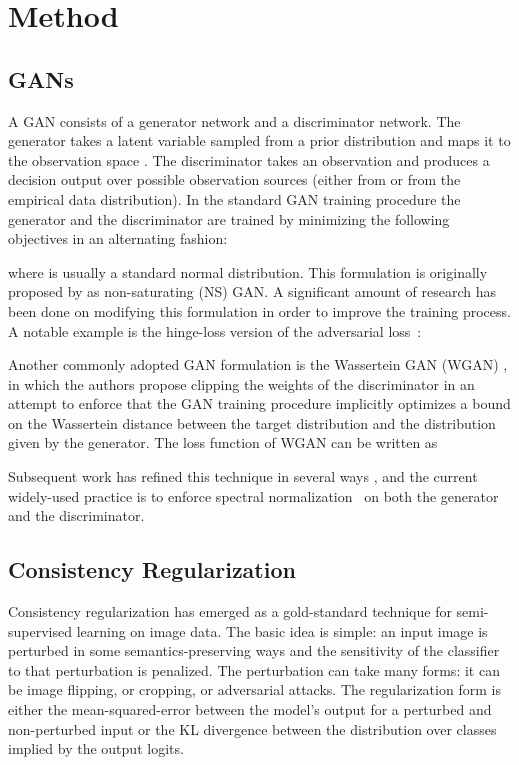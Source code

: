 \documentclass{article} \usepackage{iclr2020_conference,times}
\begin{document}
\section{Method}

\subsection{GANs} \label{sec:gans}
A GAN consists of a generator network and a discriminator network.
The generator  takes a latent variable  sampled from a prior distribution and maps it to the observation space .
The discriminator  takes an observation  and produces a decision output over possible observation sources (either from  or from the empirical data distribution). 
In the standard GAN training procedure the generator  and the discriminator  are trained by minimizing the following objectives in an alternating fashion:

where  is usually a standard normal distribution. This formulation is originally proposed by \citet{goodfellow2014generative} as non-saturating (NS) GAN. A significant amount of research has been done on modifying this formulation in order to improve the training process. A notable example is the hinge-loss version of the adversarial loss~\citep{lim2017, Tran2017}:

Another commonly adopted GAN formulation is the Wassertein GAN (WGAN) \citep{WGAN}, in which the authors propose clipping the weights of the discriminator in an attempt to enforce that the GAN training procedure implicitly optimizes
a bound on the Wassertein distance between the target distribution and the distribution given by the generator. The loss function of WGAN can be written as

Subsequent work has refined this technique in several ways 
\citep{WGANGP,Miyato18a,SAGAN},
and the current widely-used practice is to enforce spectral normalization~\citep{Miyato18a} on both the generator and the discriminator.

\subsection{Consistency Regularization}
Consistency regularization has emerged as a gold-standard technique \citep{CONSISTENCY,laine2016temporal,CONSISTENCYAVITAL,UDACONSISTENCY,REALISTICSSL, mixmatch2019} for
semi-supervised learning on image data.
The basic idea is simple: an input image is perturbed in some semantics-preserving ways
and the sensitivity of the classifier to that perturbation is penalized. 
The perturbation can take many forms: it can be image flipping, or cropping, or adversarial attacks.
The regularization form is either the mean-squared-error \citep{CONSISTENCY,laine2016temporal} between the model's output for a perturbed and non-perturbed input or the KL divergence \citep{UDACONSISTENCY, miyato2018virtual} between the distribution over classes implied by the output logits.
\end{document}
